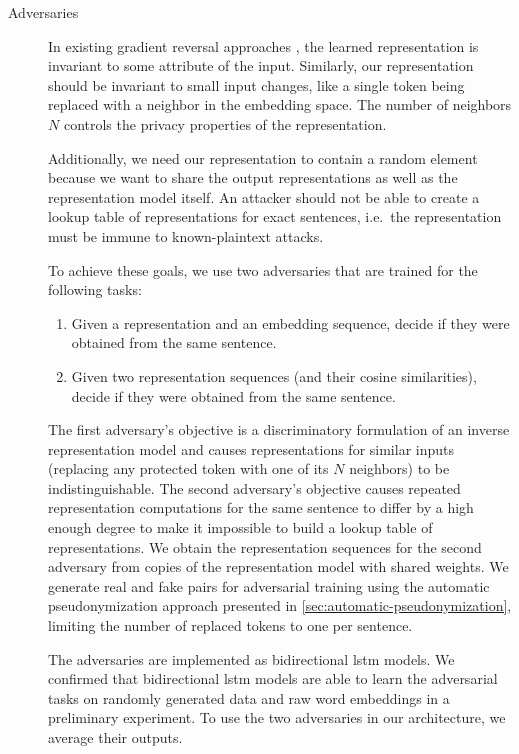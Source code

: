\begin{description}
    \item[Adversaries]
    In existing gradient reversal approaches \citep{ganin2016domain,feutry2018learning,elazar2018adversarial}, the learned representation is invariant to some attribute of the input.
    Similarly, our representation should be invariant to small input changes, like a single token being replaced with a neighbor in the embedding space.
    The number of neighbors $N$ controls the privacy properties of the representation.
    
    Additionally, we need our representation to contain a random element because we want to share the output representations as well as the representation model itself.
    An attacker should not be able to create a lookup table of representations for exact sentences, i.e.\ the representation must be immune to known-plaintext attacks.
    
    To achieve these goals, we use two adversaries that are trained for the following tasks:
    \begin{enumerate}
        \item Given a representation and an embedding sequence, decide if they were obtained from the same sentence.
        \item Given two representation sequences (and their cosine similarities), decide if they were obtained from the same sentence.
    \end{enumerate}
    
    The first adversary's objective is a discriminatory formulation of an inverse representation model and causes representations for similar inputs (replacing any protected token with one of its $N$ neighbors) to be indistinguishable.
    The second adversary's objective causes repeated representation computations for the same sentence to differ by a high enough degree to make it impossible to build a lookup table of representations.
    We obtain the representation sequences for the second adversary from copies of the representation model with shared weights.
    We generate real and fake pairs for adversarial training using the automatic pseudonymization approach presented in \cref{sec:automatic-pseudonymization}, limiting the number of replaced tokens to one per sentence.
    
    The adversaries are implemented as bidirectional \ac{lstm} models.
    We confirmed that bidirectional \ac{lstm} models are able to learn the adversarial tasks on randomly generated data and raw word embeddings in a preliminary experiment.
    To use the two adversaries in our architecture, we average their outputs.
    

\end{description}
